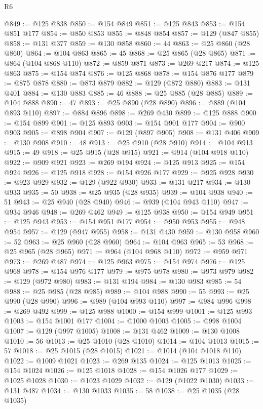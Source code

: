 \begin{lexlean}{R6}
\begin{coremodule}
@849 := @125 @838
@850 := @154 @849
@851 := @125 @843
@853 := @154 @851 @177
@854 := @850 @853
@855 := @848 @854
@857 := @129 (@847 @855)
@858 := @131 @377
@859 := @130 @858
@860 := 44
@863 := @25 @860 (@28 @860)
@864 := @104 @863
@865 := 45
@868 := @25 @865 (@28 @865)
@871 := @864 (@104 @868 @110)
@872 := @859 @871
@873 := @269 @217
@874 := @125 @863
@875 := @154 @874
@876 := @125 @868
@878 := @154 @876 @177
@879 := @875 @878
@880 := @873 @879
@882 := @129 (@872 @880)
@883 := @131 @401
@884 := @130 @883
@885 := 46
@888 := @25 @885 (@28 @885)
@889 := @104 @888
@890 := 47
@893 := @25 @890 (@28 @890)
@896 := @889 (@104 @893 @110)
@897 := @884 @896
@898 := @269 @430
@899 := @125 @888
@900 := @154 @899
@901 := @125 @893
@903 := @154 @901 @177
@904 := @900 @903
@905 := @898 @904
@907 := @129 (@897 @905)
@908 := @131 @406
@909 := @130 @908
@910 := 48
@913 := @25 @910 (@28 @910)
@914 := @104 @913
@915 := 49
@918 := @25 @915 (@28 @915)
@921 := @914 (@104 @918 @110)
@922 := @909 @921
@923 := @269 @194
@924 := @125 @913
@925 := @154 @924
@926 := @125 @918
@928 := @154 @926 @177
@929 := @925 @928
@930 := @923 @929
@932 := @129 (@922 @930)
@933 := @131 @217
@934 := @130 @933
@935 := 50
@938 := @25 @935 (@28 @935)
@939 := @104 @938
@940 := 51
@943 := @25 @940 (@28 @940)
@946 := @939 (@104 @943 @110)
@947 := @934 @946
@948 := @269 @462
@949 := @125 @938
@950 := @154 @949
@951 := @125 @943
@953 := @154 @951 @177
@954 := @950 @953
@955 := @948 @954
@957 := @129 (@947 @955)
@958 := @131 @430
@959 := @130 @958
@960 := 52
@963 := @25 @960 (@28 @960)
@964 := @104 @963
@965 := 53
@968 := @25 @965 (@28 @965)
@971 := @964 (@104 @968 @110)
@972 := @959 @971
@973 := @269 @487
@974 := @125 @963
@975 := @154 @974
@976 := @125 @968
@978 := @154 @976 @177
@979 := @975 @978
@980 := @973 @979
@982 := @129 (@972 @980)
@983 := @131 @194
@984 := @130 @983
@985 := 54
@988 := @25 @985 (@28 @985)
@989 := @104 @988
@990 := 55
@993 := @25 @990 (@28 @990)
@996 := @989 (@104 @993 @110)
@997 := @984 @996
@998 := @269 @492
@999 := @125 @988
@1000 := @154 @999
@1001 := @125 @993
@1003 := @154 @1001 @177
@1004 := @1000 @1003
@1005 := @998 @1004
@1007 := @129 (@997 @1005)
@1008 := @131 @462
@1009 := @130 @1008
@1010 := 56
@1013 := @25 @1010 (@28 @1010)
@1014 := @104 @1013
@1015 := 57
@1018 := @25 @1015 (@28 @1015)
@1021 := @1014 (@104 @1018 @110)
@1022 := @1009 @1021
@1023 := @269 @135
@1024 := @125 @1013
@1025 := @154 @1024
@1026 := @125 @1018
@1028 := @154 @1026 @177
@1029 := @1025 @1028
@1030 := @1023 @1029
@1032 := @129 (@1022 @1030)
@1033 := @131 @487
@1034 := @130 @1033
@1035 := 58
@1038 := @25 @1035 (@28 @1035)

\end{coremodule}
\end{lexlean}
